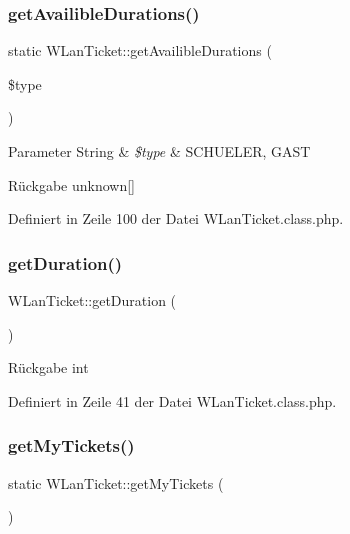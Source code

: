 \subsubsection{\texorpdfstring{get\+Availible\+Durations()}{getAvailibleDurations()}}
{\footnotesize\ttfamily static W\+Lan\+Ticket\+::get\+Availible\+Durations (\begin{DoxyParamCaption}\item[{}]{\$type }\end{DoxyParamCaption})\hspace{0.3cm}{\ttfamily [static]}}


\begin{DoxyParams}[1]{Parameter}
String & {\em \$type} & S\+C\+H\+U\+E\+L\+ER, G\+A\+ST \\
\hline
\end{DoxyParams}
\begin{DoxyReturn}{Rückgabe}
unknown\mbox{[}\mbox{]} 
\end{DoxyReturn}


Definiert in Zeile 100 der Datei W\+Lan\+Ticket.\+class.\+php.

\mbox{\label{class_w_lan_ticket_acebd8f64f4b8e4ff528c25778c0fb25d}} 
\subsubsection{\texorpdfstring{get\+Duration()}{getDuration()}}
{\footnotesize\ttfamily W\+Lan\+Ticket\+::get\+Duration (\begin{DoxyParamCaption}{ }\end{DoxyParamCaption})}

\begin{DoxyReturn}{Rückgabe}
int 
\end{DoxyReturn}


Definiert in Zeile 41 der Datei W\+Lan\+Ticket.\+class.\+php.

\mbox{\label{class_w_lan_ticket_a4a2aa35fac41f07ef29442c53369b74e}} 
\subsubsection{\texorpdfstring{get\+My\+Tickets()}{getMyTickets()}}
{\footnotesize\ttfamily static W\+Lan\+Ticket\+::get\+My\+Tickets (\begin{DoxyParamCaption}{ }\end{DoxyParamCaption})\hspace{0.3cm}{\ttfamily [static]}}

